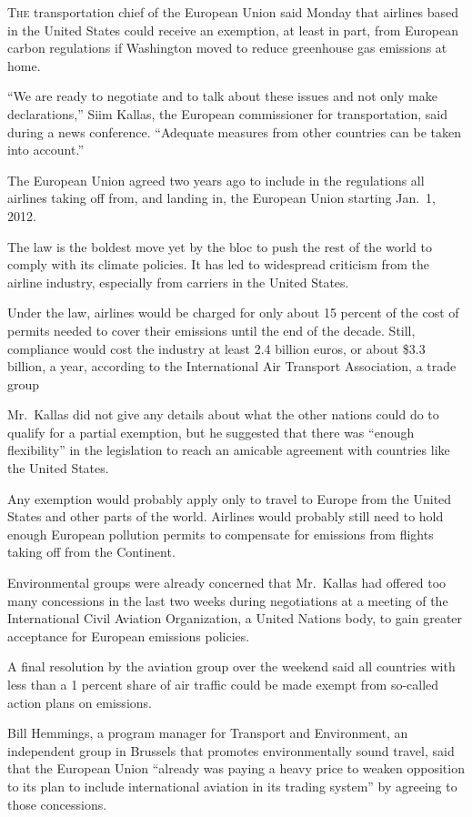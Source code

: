 ﻿\documentclass[12pt]{article}
\begin{document}
\lettrine{T}{he} transportation chief of the European Union said Monday that
airlines based in the United States could receive an exemption, at least in part, from European
carbon regulations if Washington moved to reduce greenhouse gas emissions at home.

``We are ready to negotiate and to talk about these issues and not only make declarations,'' Siim
Kallas, the European commissioner for transportation, said during a news conference. ``Adequate
measures from other countries can be taken into account.''

The European Union agreed two years ago to include in the regulations all airlines taking off from,
and landing in, the European Union starting Jan.~1, 2012.

The law is the boldest move yet by the bloc to push the rest of the world to comply with its climate
policies. It has led to widespread criticism from the airline industry, especially from carriers in
the United States.

Under the law, airlines would be charged for only about 15 percent of the cost of permits needed to
cover their emissions until the end of the decade. Still, compliance would cost the industry at
least 2.4 billion euros, or about \$3.3 billion, a year, according to the International Air
Transport Association, a trade group

Mr.~Kallas did not give any details about what the other nations could do to qualify for a partial
exemption, but he suggested that there was ``enough flexibility'' in the legislation to reach an
amicable agreement with countries like the United States.

Any exemption would probably apply only to travel to Europe from the United States and other parts
of the world. Airlines would probably still need to hold enough European pollution permits to
compensate for emissions from flights taking off from the Continent.

Environmental groups were already concerned that Mr.~Kallas had offered too many concessions in the
last two weeks during negotiations at a meeting of the International Civil Aviation Organization, a
United Nations body, to gain greater acceptance for European emissions policies.

A final resolution by the aviation group over the weekend said all countries with less than a 1
percent share of air traffic could be made exempt from so-called action plans on emissions.

Bill Hemmings, a program manager for Transport and Environment, an independent group in Brussels
that promotes environmentally sound travel, said that the European Union ``already was paying a
heavy price to weaken opposition to its plan to include international aviation in its trading
system'' by agreeing to those concessions.
\end{document}

